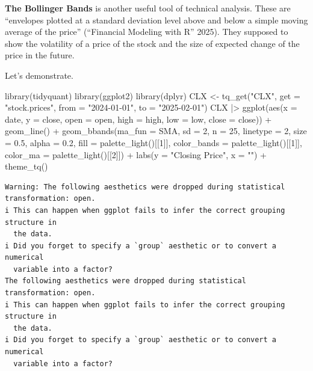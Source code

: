 \documentclass[
  letterpaper,
  DIV=11,
  numbers=noendperiod]{scrartcl}
\newenvironment{Shaded}{\begin{snugshade}}{\end{snugshade}}
\newcommand{\AttributeTok}[1]{\textcolor[rgb]{0.40,0.45,0.13}{#1}}
\newcommand{\DecValTok}[1]{\textcolor[rgb]{0.68,0.00,0.00}{#1}}
\newcommand{\FloatTok}[1]{\textcolor[rgb]{0.68,0.00,0.00}{#1}}
\newcommand{\FunctionTok}[1]{\textcolor[rgb]{0.28,0.35,0.67}{#1}}
\newcommand{\NormalTok}[1]{\textcolor[rgb]{0.00,0.23,0.31}{#1}}
\newcommand{\OtherTok}[1]{\textcolor[rgb]{0.00,0.23,0.31}{#1}}
\newcommand{\SpecialCharTok}[1]{\textcolor[rgb]{0.37,0.37,0.37}{#1}}
\newcommand{\StringTok}[1]{\textcolor[rgb]{0.13,0.47,0.30}{#1}}
\begin{document}
\textbf{The Bollinger Bands} is another useful tool of technical
analysis. These are ``envelopes plotted at a standard deviation level
above and below a simple moving average of the price'' ({``Financial
Modeling with {R}''} 2025). They supposed to show the volatility of a
price of the stock and the size of expected change of the price in the
future.

Let's demonstrate.

\begin{Shaded}
\begin{Highlighting}[]
\FunctionTok{library}\NormalTok{(tidyquant)}
\FunctionTok{library}\NormalTok{(ggplot2)}
\FunctionTok{library}\NormalTok{(dplyr)}
\NormalTok{CLX }\OtherTok{\textless{}{-}} \FunctionTok{tq\_get}\NormalTok{(}\StringTok{"CLX"}\NormalTok{, }\AttributeTok{get =} \StringTok{"stock.prices"}\NormalTok{, }\AttributeTok{from =} \StringTok{"2024{-}01{-}01"}\NormalTok{, }
               \AttributeTok{to =} \StringTok{"2025{-}02{-}01"}\NormalTok{)}
\NormalTok{CLX }\SpecialCharTok{|\textgreater{}}
  \FunctionTok{ggplot}\NormalTok{(}\FunctionTok{aes}\NormalTok{(}\AttributeTok{x =}\NormalTok{ date, }\AttributeTok{y =}\NormalTok{ close, }\AttributeTok{open =}\NormalTok{ open,}
              \AttributeTok{high =}\NormalTok{ high, }\AttributeTok{low =}\NormalTok{ low, }\AttributeTok{close =}\NormalTok{ close)) }\SpecialCharTok{+}
    \FunctionTok{geom\_line}\NormalTok{() }\SpecialCharTok{+}
    \FunctionTok{geom\_bbands}\NormalTok{(}\AttributeTok{ma\_fun =}\NormalTok{ SMA, }\AttributeTok{sd =} \DecValTok{2}\NormalTok{, }\AttributeTok{n =} \DecValTok{25}\NormalTok{,}
                \AttributeTok{linetype =} \DecValTok{2}\NormalTok{, }\AttributeTok{size =} \FloatTok{0.5}\NormalTok{, }\AttributeTok{alpha =} \FloatTok{0.2}\NormalTok{,}
                \AttributeTok{fill        =} \FunctionTok{palette\_light}\NormalTok{()[[}\DecValTok{1}\NormalTok{]],}
                \AttributeTok{color\_bands =} \FunctionTok{palette\_light}\NormalTok{()[[}\DecValTok{1}\NormalTok{]],}
                \AttributeTok{color\_ma    =} \FunctionTok{palette\_light}\NormalTok{()[[}\DecValTok{2}\NormalTok{]]) }\SpecialCharTok{+}
    \FunctionTok{labs}\NormalTok{(}\AttributeTok{y =} \StringTok{"Closing Price"}\NormalTok{, }\AttributeTok{x =} \StringTok{""}\NormalTok{) }\SpecialCharTok{+}
    \FunctionTok{theme\_tq}\NormalTok{()}
\end{Highlighting}
\end{Shaded}

\begin{verbatim}
Warning: The following aesthetics were dropped during statistical transformation: open.
i This can happen when ggplot fails to infer the correct grouping structure in
  the data.
i Did you forget to specify a `group` aesthetic or to convert a numerical
  variable into a factor?
The following aesthetics were dropped during statistical transformation: open.
i This can happen when ggplot fails to infer the correct grouping structure in
  the data.
i Did you forget to specify a `group` aesthetic or to convert a numerical
  variable into a factor?
\end{verbatim}
\end{document}
